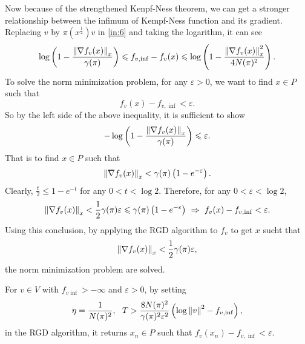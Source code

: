\documentclass[suri,pdfbookmark]{engsuribt} %
\begin{document}
  Now because of the strengthened Kenpf-Ness theorem, we can get a stronger relationship between the infimum of Kempf-Ness function and its gradient. Replacing $v$ by $\pi(x^{\frac{1}{2}})v$ in \ref{in:6} and taking the logarithm, it can see
  \begin{equation*}
    \log\left(1-\frac{\left\lVert\nabla f_v(x)\right\lVert_{x}}{\gamma(\pi)}\right) \leqslant f_{v,\inf}- f_v(x) \leqslant \log\left(1-\frac{\left\lVert\nabla f_v(x)\right\lVert_{x}^2}{4N(\pi)^2}\right).
  \end{equation*}
  To solve the norm minimization problem, for any $\varepsilon > 0$, we want to find $x \in P$ such that
  \begin{equation*}
    f_v(x) - f_{v,\inf} < \varepsilon.
  \end{equation*}
  So by the left side of the above inequality, it is sufficient to show
  \begin{equation*}
    -\log\left(1-\frac{\left\lVert\nabla f_v(x)\right\lVert_{x}}{\gamma(\pi)}\right) \leqslant \varepsilon.
  \end{equation*}
  That is to find $x \in P$ such that
  \begin{equation*}
    \left\lVert\nabla f_v(x)\right\lVert_{x} < \gamma(\pi)\left(1-e^{-\varepsilon}\right).
  \end{equation*}
  Clearly, $\frac{t}{2} \leqslant 1 - e^{-t}$ for any $0<t<\log 2$. Therefore, for any $0 < \varepsilon < \log2$,
  \begin{equation*}
    \left\lVert\nabla f_v(x)\right\lVert_{x} < \frac{1}{2}\gamma(\pi)\varepsilon \leqslant \gamma(\pi)\left(1-e^{-\varepsilon}\right)~\Rightarrow~f_v(x) - f_{v,\inf} < \varepsilon.
  \end{equation*}
  Using this conclusion, by applying the RGD algorithm to $f_v$ to get $x$ sucht that
  \begin{equation*}
    \left\lVert\nabla f_v(x)\right\lVert_{x} < \frac{1}{2}\gamma(\pi)\varepsilon,
  \end{equation*}
  the norm minimization problem are solved.

  \begin{thm}
    For $v \in V$ with $f_{v \inf} > -\infty$ and $\varepsilon >0$, by setting
    \begin{equation*}
      \eta = \frac{1}{N(\pi)^2},~~T > \frac{8N(\pi)^2}{\gamma(\pi)^2\varepsilon^2}\left(\log \left\lVert v\right\lVert^2-f_{v,\inf}\right),
    \end{equation*}
    in the RGD algorithm, it returns $x_n \in P$ such that $f_v(x_n) - f_{v,\inf} < \varepsilon$.
  \end{thm}
\end{document}
